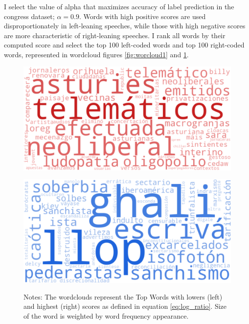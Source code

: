 \documentclass[12pt]{article}
\begin{document}
	I select the value of alpha that maximizes accuracy of label prediction in the congress dataset; $\alpha=0.9$.	
	Words with high positive scores are used disproportionately in left-leaning speeches, while those with high negative scores are more characteristic of right-leaning speeches. I rank all words by their computed score and select the top 100 left-coded words and top 100 right-coded words, represented in wordcloud figures  \ref{fig:worcloud1} and \ref{fig:worcloud2}.
	

	
	
	
	
	\begin{figure}[H]
		\centering
		\begin{minipage}{0.46\textwidth}
						\label{fig:wordcloud1}
			\centering
			\includegraphics[width=\linewidth]{figures/congress_left.pdf}

		\end{minipage}
		\hspace{0.04\textwidth}
		\begin{minipage}{0.46\textwidth}
						\label{fig:worcloud2}
			\centering
			\includegraphics[width=\linewidth]{figures/congress_right.pdf}


		\end{minipage}
		\caption*{\small Notes: The wordclouds represent the Top Words with lowers (left) and highest (right) scores as defined in equation \ref{eq:log_ratio}. Size of the word is weighted by word frequency appearance.  }
	\end{figure}
	
\end{document}
